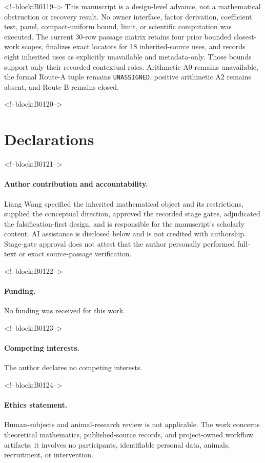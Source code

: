 \documentclass[11pt]{article}
\begin{document}
<!--block:B0119-->
This manuscript is a design-level advance, not a mathematical
obstruction or recovery result. No owner interface, factor derivation, coefficient
test, panel, compact-uniform bound, limit, or scientific computation was executed.
The current 30-row passage matrix retains four prior bounded closest-work scopes,
finalizes exact locators for 18 inherited-source uses, and records eight inherited
uses as explicitly unavailable and metadata-only. Those bounds support only their
recorded contextual roles. Arithmetic A0 remains unavailable, the formal Route-A
tuple remains \texttt{UNASSIGNED}, positive arithmetic A2 remains absent, and Route B
remains closed.

<!--block:B0120-->
\section*{Declarations}

<!--block:B0121-->
\paragraph{Author contribution and accountability.}
Liang Wang specified the inherited mathematical object and its
restrictions, supplied the conceptual direction, approved the recorded
stage gates, adjudicated the falsification-first design, and is
responsible for the manuscript's scholarly content. AI assistance is
disclosed below and is not credited with authorship. Stage-gate approval
does not attest that the author personally performed full-text or exact
source-passage verification.

<!--block:B0122-->
\paragraph{Funding.} No funding was received for this work.

<!--block:B0123-->
\paragraph{Competing interests.} The author declares no competing
interests.

<!--block:B0124-->
\paragraph{Ethics statement.} Human-subjects and animal-research review
is not applicable. The work concerns theoretical mathematics,
published-source records, and project-owned workflow artifacts; it
involves no participants, identifiable personal data, animals,
recruitment, or intervention.
\end{document}
